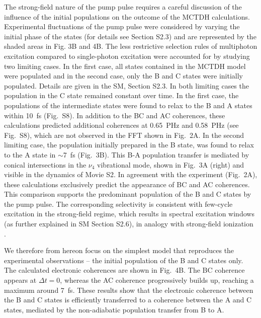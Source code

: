 \documentclass[12pt]{article}
\begin{document}
The strong-field nature of the pump pulse requires a careful discussion of the influence of the initial populations on the outcome of the MCTDH calculations. Experimental fluctuations of the pump pulse were considered by varying the initial phase of the states (for details see Section S2.3) and are represented by the shaded areas in Fig. 3B and 4B.  The less restrictive selection rules of multiphoton excitation compared to single-photon excitation were accounted for by studying two limiting cases. In the first case, all states contained in the MCTDH model were populated and in the second case, only the B and C states were initially populated. Details are given in the SM, Section S2.3. In both limiting cases the population in the C state remained constant over time. In the first case, the populations of the intermediate states were found to relax to the B and A states within 10~fs (Fig.~S8). In addition to the BC and AC coherences, these calculations predicted additional coherences at 0.65~PHz and 0.58~PHz (see Fig.~S8), which are not observed in the FFT shown in Fig.~2A. In the second limiting case, the population initially prepared in the B state, was found to relax to the A state in $\sim$7~fs (Fig.~3B). This B-A population transfer is mediated by conical intersections in the $\nu_4$ vibrational mode, shown in Fig.~3A (right) and visible in the dynamics of Movie S2. In agreement with the experiment (Fig.~2A), these calculations exclusively predict the appearance of BC and AC coherences. This comparison supports the predominant population of the B and C states by the pump pulse. The corresponding selectivity is consistent with few-cycle excitation in the strong-field regime, which results in spectral excitation windows (as further explained in SM Section S2.6), in analogy with strong-field ionization \cite{pabst16a}.


We therefore from hereon focus on the simplest model that reproduces the experimental observations -- the initial population of the B and C states only. The calculated electronic coherences are shown in Fig.~4B. The BC coherence appears at $\Delta t=0$, whereas the AC coherence progressively builds up, reaching a maximum around 7~fs. These results show that the electronic coherence between the B and C states is efficiently transferred to a coherence between the A and C states, mediated by the non-adiabatic population transfer from B to A.
\end{document}
